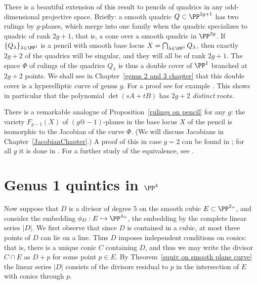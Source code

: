 \begin{fact}
There is a beautiful extension of this result to pencils of quadrics
in any odd-dimensional projective space. Briefly: a smooth quadric $Q
\subset \PP^{2g+1}$ has two rulings by $g$-planes, which merge into
one family when the quadric specializes to quadric of rank $2g+1$,
that is, a cone over a smooth quadric in $\PP^{2g}$. If
$\{Q_\lambda\}_{\lambda \in \PP^1}$ is a pencil with smooth base locus
$X = \bigcap_{\lambda \in \PP^1} Q_\lambda$, then exactly $2g+2$ of
the quadrics will be singular, and they will all be of rank $2g+1$.
The space $\Phi$ of rulings of the quadrics $Q_\lambda$ is thus a
double cover of $\PP^1$ branched at $2g+2$  points. We shall see in
Chapter~\ref{genus 2 and 3 chapter} that this
%
double cover
is a
%
hyperelliptic curve of genus $g$. For a proof see for
example \cite[Proposition 22.34]{Harris1995}.
 This shows in particular that the polynomial $\det(sA+tB)$ has $2g+2$ \emph{distinct} roots.

There is
a remarkable analogue of Proposition~\ref{rulings on pencil}
for any $g$: the variety $F_{g-1}(X)$ of $(g@{-}1)$-planes in
the base locus $X$ of the pencil is isomorphic to the
%
Jacobian
of the  curve $\Phi$. (We will discuss Jacobians in Chapter~\ref{JacobianChapter}.) A proof of this in case $g=2$ can be found in \cite{Griffiths-Harris1978}; for all $g$ it is done in \cite{Donagi}. For a further study of the equivalence, see \cite{Eisenbud-Schreyer}.
\end{fact}

\section{Genus 1 quintics in $\PP^4$}
\label{g=1 in P4}\label{Genus 1 quintics in P4}

Now suppose that $D$ is a
divisor of degree 5
on the smooth cubic $E\subset \PP^2` `$, and consider the embedding
%
$\phi_D : E \hookrightarrow  \PP^4` `$, the embedding by the complete linear series $|D|$. We first observe that since $D$ is
contained in a cubic, at most three points of $D$ can lie on a line.
Thus $D$ imposes independent conditions on conics: that is, there is a
unique conic $C$ containing $D$,
and thus we may write the divisor $C\cap E$ as $D+p$ for some point $p\in E$. By Theorem~\ref{equiv on smooth plane curve}
the linear series $|D|$ consists of the divisors
residual
%
to $p$ in the intersection of $E$ with conics through $p$.

